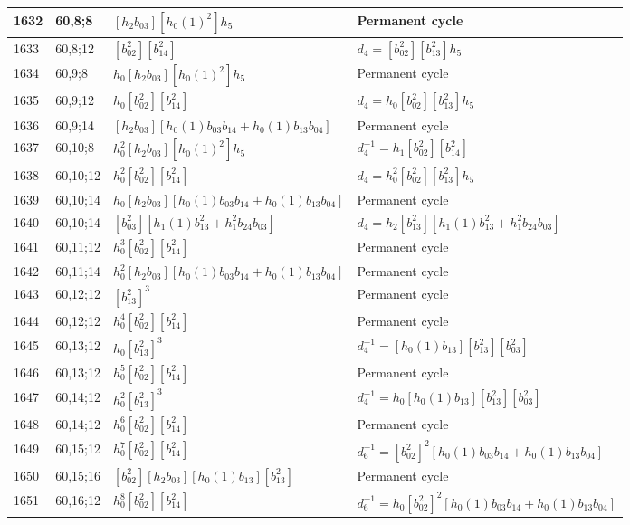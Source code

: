 \documentclass{article}
\begin{document}
\begin{longtable}{|l|l|>{\raggedright\arraybackslash}p{6cm}|>{\raggedright\arraybackslash}p{6cm}|}
\hline
1632 & 60,8;8 & $[h_2b_{03}][h_0(1)^2]h_5$ & Permanent cycle\\
\hline
1633 & 60,8;12 & $[b_{02}^2][b_{14}^2]$ &$d_{4}=[b_{02}^2][b_{13}^2]h_5$\\
\hline
1634 & 60,9;8 & $h_0[h_2b_{03}][h_0(1)^2]h_5$ & Permanent cycle\\
\hline
1635 & 60,9;12 & $h_0[b_{02}^2][b_{14}^2]$ &$d_{4}=h_0[b_{02}^2][b_{13}^2]h_5$\\
\hline
1636 & 60,9;14 & $[h_2b_{03}][h_0(1)b_{03}b_{14} + h_0(1)b_{13}b_{04}]$ & Permanent cycle\\
\hline
1637 & 60,10;8 & $h_0^2[h_2b_{03}][h_0(1)^2]h_5$ & $d_{4}^{-1}=h_1[b_{02}^2][b_{14}^2]$\\
\hline
1638 & 60,10;12 & $h_0^2[b_{02}^2][b_{14}^2]$ &$d_{4}=h_0^2[b_{02}^2][b_{13}^2]h_5$\\
\hline
1639 & 60,10;14 & $h_0[h_2b_{03}][h_0(1)b_{03}b_{14} + h_0(1)b_{13}b_{04}]$ & Permanent cycle\\
1640 & 60,10;14 & $[b_{03}^2][h_1(1)b_{13}^2 + h_1^2b_{24}b_{03}]$ &$d_{4}=h_2[b_{13}^2][h_1(1)b_{13}^2 + h_1^2b_{24}b_{03}]$\\
\hline
1641 & 60,11;12 & $h_0^3[b_{02}^2][b_{14}^2]$ & Permanent cycle\\
\hline
1642 & 60,11;14 & $h_0^2[h_2b_{03}][h_0(1)b_{03}b_{14} + h_0(1)b_{13}b_{04}]$ & Permanent cycle\\
\hline
1643 & 60,12;12 & $[b_{13}^2]^3$ & Permanent cycle\\
1644 & 60,12;12 & $h_0^4[b_{02}^2][b_{14}^2]$ & Permanent cycle\\
\hline
1645 & 60,13;12 & $h_0[b_{13}^2]^3$ & $d_{4}^{-1}=[h_0(1)b_{13}][b_{13}^2][b_{03}^2]$\\
1646 & 60,13;12 & $h_0^5[b_{02}^2][b_{14}^2]$ & Permanent cycle\\
\hline
1647 & 60,14;12 & $h_0^2[b_{13}^2]^3$ & $d_{4}^{-1}=h_0[h_0(1)b_{13}][b_{13}^2][b_{03}^2]$\\
1648 & 60,14;12 & $h_0^6[b_{02}^2][b_{14}^2]$ & Permanent cycle\\
\hline
1649 & 60,15;12 & $h_0^7[b_{02}^2][b_{14}^2]$ & $d_{6}^{-1}=[b_{02}^2]^2[h_0(1)b_{03}b_{14} + h_0(1)b_{13}b_{04}]$\\
\hline
1650 & 60,15;16 & $[b_{02}^2][h_2b_{03}][h_0(1)b_{13}][b_{13}^2]$ & Permanent cycle\\
\hline
1651 & 60,16;12 & $h_0^8[b_{02}^2][b_{14}^2]$ & $d_{6}^{-1}=h_0[b_{02}^2]^2[h_0(1)b_{03}b_{14} + h_0(1)b_{13}b_{04}]$\\

\end{longtable}
\end{document}
